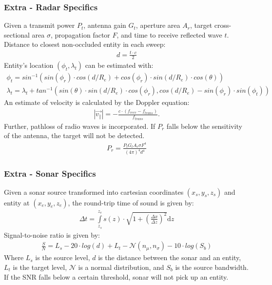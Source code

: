 \documentclass[mathserif,usenames,dvipsnames]{beamer}
\begin{document}
\frame
{
    \frametitle{Extra - Radar Specifics}
    \small
    Given a transmit power $P_t$, antenna gain $G_t$, aperture area $A_r$, target cross-sectional area $\sigma$, propagation factor $F$, and time to receive reflected wave $t$.      Distance to closest non-occluded entity in each sweep:
    {\footnotesize
    \begin{align*}
        d = \frac{t \cdot c}{2}
    \end{align*}
    }
    Entity's location $\left(\phi_t, \lambda_t\right)$ can be estimated with:
    {\footnotesize
    \begin{align*}
        \phi_t = sin^{-1}\left(sin\left(\phi_r\right) \cdot cos\left(d/R_{e}\right) + cos\left(\phi_r\right) \cdot sin\left(d/R_{e}\right) \cdot cos\left(\theta\right)\right) \\ 
        \lambda_t = \lambda_t + tan^{-1}\left(sin\left(\theta\right) \cdot sin\left(d/R_{e}\right) \cdot cos\left(\phi_r\right), cos\left(d/R_{e}\right)-sin\left(\phi_r\right) \cdot sin\left(\phi_t\right)\right)
    \end{align*}
    }
    An estimate of velocity is calculated by the Doppler equation:
    {\footnotesize
    \begin{align*}
        \left|\vec{v_{\parallel}}\right| = -\frac{c \cdot \left(f_{recv} - f_{trans}\right)}{f_{trans}}.
    \end{align*}
    }
    Further, pathloss of radio waves is incorporated. If $P_r$ falls below the sensitivity of the antenna, the target will not be detected.
    {\footnotesize
    \begin{align*}
        P_r = \frac{P_t G_t A_r \sigma F^4}{\left(4 \pi\right)^4 d^4}
    \end{align*}
    }
}

\frame
{
    \frametitle{Extra - Sonar Specifics}
    \small
    Given a sonar source transformed into cartesian coordinates $(x_s, y_s, z_s)$ and entity at $(x_e, y_e, z_e)$, the round-trip time of sound is given by:
    \begin{align*}
        \Delta t = \int\limits_{z_s}^{z_e}{s(z) \cdot \sqrt{1 + \left(\frac{\Delta x}{\Delta z}\right)^2} \mathrm{d}z}
    \end{align*}
    Signal-to-noise ratio is given by:
    \begin{align*}
        \frac{S}{N} = L_s - 20 \cdot log(d) + L_t - \mathcal{N}(n_\mu, n_\sigma) - 10 \cdot log(S_b)
    \end{align*}
    Where $L_s$ is the source level, $d$ is the distance between the sonar and an entity, $L_t$ is the target level, $\mathcal{N}$ is a normal distribution, and $S_b$ is the source bandwidth.  If the SNR falls below a certain threshold, sonar will not pick up an entity.
}
\end{document}
